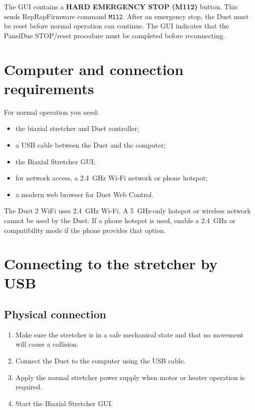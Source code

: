\documentclass[11pt,a4paper]{article}
\begin{document}
The GUI contains a \textbf{HARD EMERGENCY STOP (M112)} button. This sends RepRapFirmware command \texttt{M112}. After an emergency stop, the Duet must be reset before normal operation can continue. The GUI indicates that the PanelDue STOP/reset procedure must be completed before reconnecting.

\section{Computer and connection requirements}

For normal operation you need:
\begin{itemize}
  \item the biaxial stretcher and Duet controller;
  \item a USB cable between the Duet and the computer;
  \item the Biaxial Stretcher GUI;
  \item for network access, a 2.4~GHz Wi-Fi network or phone hotspot;
  \item a modern web browser for Duet Web Control.
\end{itemize}

The Duet 2 WiFi uses 2.4~GHz Wi-Fi. A 5~GHz-only hotspot or wireless network cannot be used by the Duet. If a phone hotspot is used, enable a 2.4~GHz or compatibility mode if the phone provides that option.

\section{Connecting to the stretcher by USB}

\subsection{Physical connection}
\begin{enumerate}
  \item Make sure the stretcher is in a safe mechanical state and that no movement will cause a collision.
  \item Connect the Duet to the computer using the USB cable.
  \item Apply the normal stretcher power supply when motor or heater operation is required.
  \item Start the Biaxial Stretcher GUI.
\end{enumerate}
\end{document}
